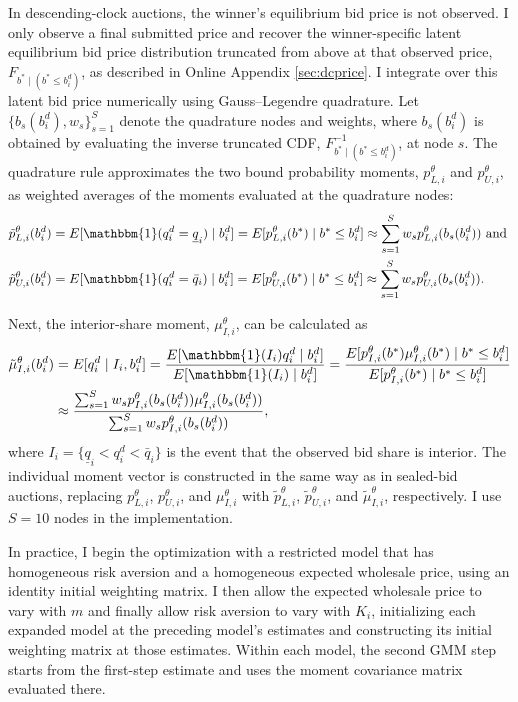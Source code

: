 \documentclass[12pt]{article}
\theoremstyle{definition} %
\newcommand{\I}{\mathbbm{1}}
\begin{document}
In descending-clock auctions, the winner's equilibrium bid price is not observed. I only observe a final submitted price and recover the winner-specific latent equilibrium bid price distribution truncated from above at that observed price, $F_{b^\ast \mid (b^\ast \leq b_i^d)}$, as described in Online Appendix \ref{sec:dcprice}. I integrate over this latent bid price numerically using Gauss--Legendre quadrature. Let $\{b_s(b_i^d),w_s\}_{s=1}^S$ denote the quadrature nodes and weights, where $b_s(b_i^d)$ is obtained by evaluating the inverse truncated CDF, $F_{b^\ast \mid (b^\ast \leq b_i^d)}^{-1}$, at node $s$. The quadrature rule approximates the two bound probability moments, $p_{L,i}^\theta$ and $p_{U,i}^\theta$, as weighted averages of the moments evaluated at the quadrature nodes:
\begin{align*}
\tilde{p}_{L,i}^\theta(b_i^d) &= E[\I(q_i^d=\underline{q}_i)\mid b_i^d] = E[p_{L,i}^\theta(b^\ast)\mid b^\ast \leq b_i^d] \approx \sum_{s=1}^S w_s p_{L,i}^\theta(b_s(b_i^d)) \text{ and }\\
\tilde{p}_{U,i}^\theta(b_i^d) &= E[\I(q_i^d=\bar{q}_i)\mid b_i^d] = E[p_{U,i}^\theta(b^\ast)\mid b^\ast \leq b_i^d] \approx \sum_{s=1}^S w_s p_{U,i}^\theta(b_s(b_i^d)).
\end{align*}

Next, the interior-share moment, $\mu_{I,i}^\theta$, can be calculated as
\begin{align*}
\tilde{\mu}_{I,i}^\theta(b_i^d) &= E[q_i^d\mid I_i,b_i^d] = \frac{E[\I(I_i) q_i^d\mid b_i^d]}{E[\I(I_i) \mid b_i^d]} = \frac{E[p_{I,i}^\theta(b^\ast) \mu_{I,i}^\theta(b^\ast)\mid b^\ast \leq b_i^d]}{E[p_{I,i}^\theta(b^\ast) \mid b^\ast \leq b_i^d]} \\
&\approx \frac{\sum_{s=1}^S w_s p_{I,i}^\theta(b_s(b_i^d)) \mu_{I,i}^\theta(b_s(b_i^d))}{\sum_{s=1}^S w_s p_{I,i}^\theta(b_s(b_i^d))},
\end{align*}
where $I_i=\{\underline{q}_i<q_i^d<\bar{q}_i\}$ is the event that the observed bid share is interior.
The individual moment vector is constructed in the same way as in sealed-bid auctions, replacing $p_{L,i}^\theta$, $p_{U,i}^\theta$, and $\mu_{I,i}^\theta$ with $\tilde{p}_{L,i}^\theta$, $\tilde{p}_{U,i}^\theta$, and $\tilde{\mu}_{I,i}^\theta$, respectively. I use $S=10$ nodes in the implementation.

In practice, I begin the optimization with a restricted model that has homogeneous risk aversion and a homogeneous expected wholesale price, using an identity initial weighting matrix. I then allow the expected wholesale price to vary with $m$ and finally allow risk aversion to vary with $K_i$, initializing each expanded model at the preceding model's estimates and constructing its initial weighting matrix at those estimates. Within each model, the second GMM step starts from the first-step estimate and uses the moment covariance matrix evaluated there.
\end{document}

